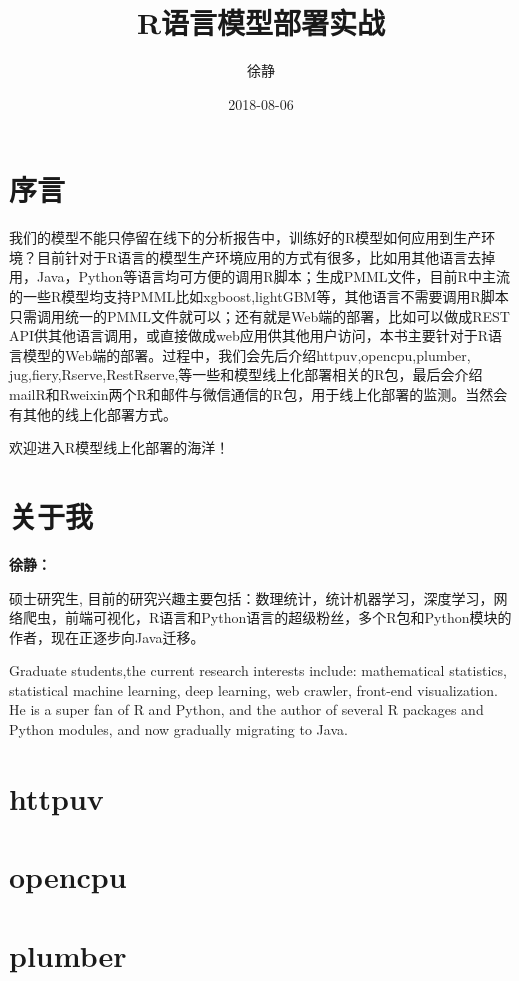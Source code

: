 \documentclass[]{book}
\title{R语言模型部署实战}
\author{徐静}
\date{2018-08-06}
\begin{document}
\maketitle

{
\setcounter{tocdepth}{1}
\tableofcontents
}
\chapter*{序言}

我们的模型不能只停留在线下的分析报告中，训练好的R模型如何应用到生产环境？目前针对于R语言的模型生产环境应用的方式有很多，比如用其他语言去掉用，Java，Python等语言均可方便的调用R脚本；生成PMML文件，目前R中主流的一些R模型均支持PMML比如xgboost,lightGBM等，其他语言不需要调用R脚本只需调用统一的PMML文件就可以；还有就是Web端的部署，比如可以做成REST
API供其他语言调用，或直接做成web应用供其他用户访问，本书主要针对于R语言模型的Web端的部署。过程中，我们会先后介绍httpuv,opencpu,plumber,
jug,fiery,Rserve,RestRserve,等一些和模型线上化部署相关的R包，最后会介绍mailR和Rweixin两个R和邮件与微信通信的R包，用于线上化部署的监测。当然会有其他的线上化部署方式。

欢迎进入R模型线上化部署的海洋！

\chapter*{关于我}

\textbf{徐静：}

硕士研究生,
目前的研究兴趣主要包括：数理统计，统计机器学习，深度学习，网络爬虫，前端可视化，R语言和Python语言的超级粉丝，多个R包和Python模块的作者，现在正逐步向Java迁移。

Graduate students,the current research interests include: mathematical
statistics, statistical machine learning, deep learning, web crawler,
front-end visualization. He is a super fan of R and Python, and the
author of several R packages and Python modules, and now gradually
migrating to Java.

\chapter{httpuv}\label{httpuv}

\chapter{opencpu}\label{opencpu}

\chapter{plumber}\label{plumber}
\end{document}
